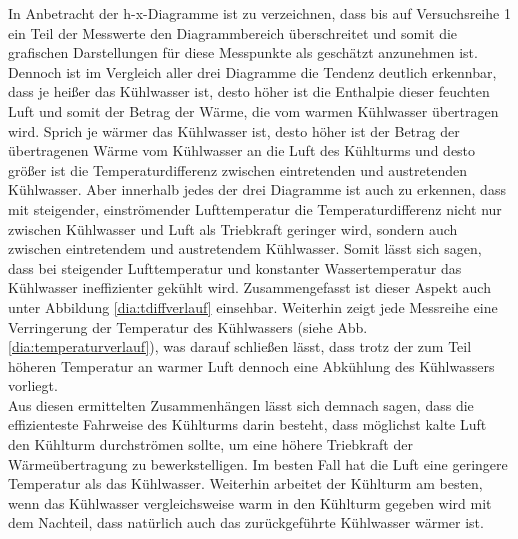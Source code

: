 In Anbetracht der h-x-Diagramme ist zu verzeichnen, dass bis auf Versuchsreihe 1 ein Teil der Messwerte den Diagrammbereich überschreitet und somit die grafischen Darstellungen für diese Messpunkte als geschätzt anzunehmen ist. Dennoch ist im Vergleich aller drei Diagramme die Tendenz deutlich erkennbar, dass je heißer das Kühlwasser ist, desto höher ist die Enthalpie dieser feuchten Luft und somit der Betrag der Wärme, die vom warmen Kühlwasser übertragen wird. Sprich je wärmer das Kühlwasser ist, desto höher ist der Betrag der übertragenen Wärme vom Kühlwasser an die Luft des Kühlturms und desto größer ist die Temperaturdifferenz zwischen eintretenden und austretenden Kühlwasser. Aber innerhalb jedes der drei Diagramme ist auch zu erkennen, dass mit steigender, einströmender Lufttemperatur die Temperaturdifferenz nicht nur zwischen Kühlwasser und Luft als Triebkraft geringer wird, sondern auch zwischen eintretendem und austretendem Kühlwasser. 
\newpage
Somit lässt sich sagen, dass bei steigender Lufttemperatur und konstanter Wassertemperatur das Kühlwasser ineffizienter gekühlt wird. Zusammengefasst ist dieser Aspekt  auch unter Abbildung \ref{dia:tdiffverlauf} einsehbar. Weiterhin zeigt jede Messreihe eine Verringerung der Temperatur des Kühlwassers (siehe Abb. \ref{dia:temperaturverlauf}), was darauf schließen lässt, dass trotz der zum Teil höheren Temperatur an warmer Luft dennoch eine Abkühlung des Kühlwassers vorliegt. \\
Aus diesen ermittelten Zusammenhängen lässt sich demnach sagen, dass die effizienteste Fahrweise des Kühlturms darin besteht, dass möglichst kalte Luft den Kühlturm durchströmen sollte, um eine höhere Triebkraft der Wärmeübertragung zu bewerkstelligen. Im besten Fall hat die Luft eine geringere Temperatur als das Kühlwasser. Weiterhin arbeitet der Kühlturm am besten, wenn das Kühlwasser vergleichsweise warm in den Kühlturm gegeben wird mit dem Nachteil, dass natürlich auch das zurückgeführte Kühlwasser wärmer ist.